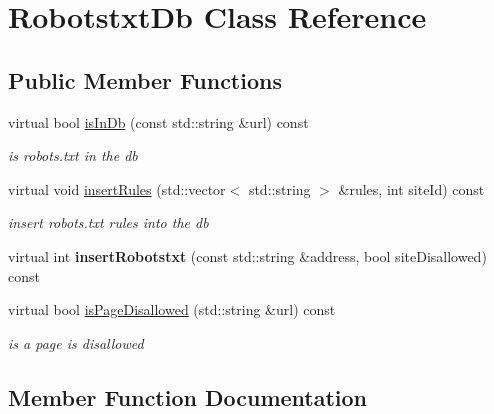 \hypertarget{classRobotstxtDb}{}\section{Robotstxt\+Db Class Reference}
\label{classRobotstxtDb}
\subsection*{Public Member Functions}
\begin{DoxyCompactItemize}
\item 
virtual bool \hyperlink{classRobotstxtDb_a1cc7a4d45061fa120d6c02f7eb359f91}{is\+In\+Db} (const std\+::string \&url) const 
\begin{DoxyCompactList}\small\item\em is robots.\+txt in the db \end{DoxyCompactList}\item 
virtual void \hyperlink{classRobotstxtDb_a7e0fa901c2293d490f5f43a3cd7923fa}{insert\+Rules} (std\+::vector$<$ std\+::string $>$ \&rules, int site\+Id) const 
\begin{DoxyCompactList}\small\item\em insert robots.\+txt rules into the db \end{DoxyCompactList}\item 
virtual int {\bfseries insert\+Robotstxt} (const std\+::string \&address, bool site\+Disallowed) const \hypertarget{classRobotstxtDb_a779cfd1177638ffd256f5c400779741e}{}\label{classRobotstxtDb_a779cfd1177638ffd256f5c400779741e}

\item 
virtual bool \hyperlink{classRobotstxtDb_a9dae4c624e64d95732d17ba031aa6675}{is\+Page\+Disallowed} (std\+::string \&url) const 
\begin{DoxyCompactList}\small\item\em is a page is disallowed \end{DoxyCompactList}\end{DoxyCompactItemize}


\subsection{Member Function Documentation}
